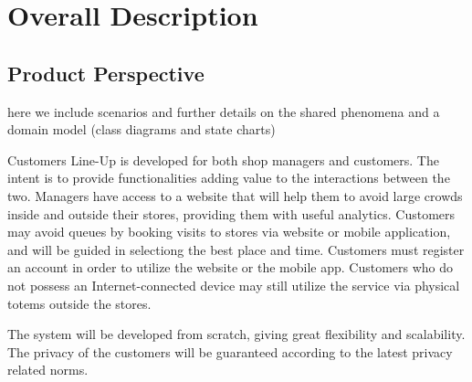 
\section{Overall Description}\label{sec:overall_desc}

\subsection{Product Perspective}

here we include scenarios and further details on the shared
phenomena and a domain model (class diagrams and state charts)

Customers Line-Up is developed for both shop managers and customers.
The intent is to provide functionalities adding value to the interactions between the two.
Managers have access to a website that will help them to avoid large crowds inside and outside their stores, providing them with useful analytics.
Customers may avoid queues by booking visits to stores via website or mobile application, and will be guided in selectiong the best place and time.
Customers must register an account in order to utilize the website or the mobile app.
Customers who do not possess an Internet-connected device may still utilize the service via physical totems outside the stores.

The system will be developed from scratch, giving great flexibility and scalability.
The privacy of the customers will be guaranteed according to the latest privacy related norms.

